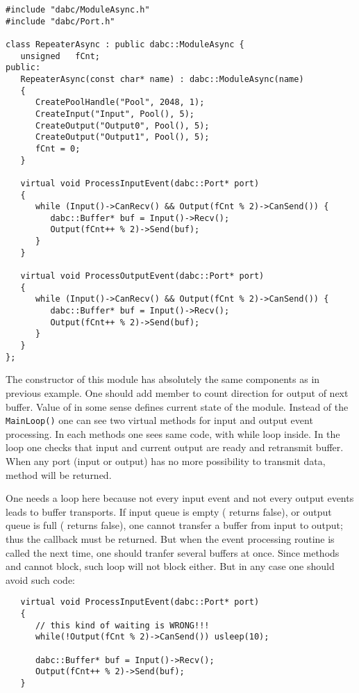 \begin{small}
\begin{verbatim}
#include "dabc/ModuleAsync.h"
#include "dabc/Port.h"

class RepeaterAsync : public dabc::ModuleAsync {
   unsigned   fCnt;
public:
   RepeaterAsync(const char* name) : dabc::ModuleAsync(name)
   {
      CreatePoolHandle("Pool", 2048, 1);
      CreateInput("Input", Pool(), 5);
      CreateOutput("Output0", Pool(), 5);
      CreateOutput("Output1", Pool(), 5);
      fCnt = 0;
   }
    
   virtual void ProcessInputEvent(dabc::Port* port) 
   {
      while (Input()->CanRecv() && Output(fCnt % 2)->CanSend()) {
         dabc::Buffer* buf = Input()->Recv();
         Output(fCnt++ % 2)->Send(buf);
      }
   }

   virtual void ProcessOutputEvent(dabc::Port* port) 
   {
      while (Input()->CanRecv() && Output(fCnt % 2)->CanSend()) {
         dabc::Buffer* buf = Input()->Recv();
         Output(fCnt++ % 2)->Send(buf);
      }
   }
};
\end{verbatim}
\end{small}

The constructor of this module has absolutely the same components as in previous example.
One should add  member to count direction for output of next buffer.
Value of  in some sense defines current state of the module. 
Instead of the {\tt MainLoop()} one can see two virtual methods for input and output event
processing. In each methods one sees same code, with while loop inside.
In the loop one checks that input and current output are ready and retransmit buffer.
When any port (input or output) has no more possibility to transmit data, 
method will be returned. 

One needs a  loop here because not every input event and not every output events leads to buffer transports. 
If input queue is empty ( returns false), 
or output queue is full ( returns false), 
one cannot transfer a buffer from input to output; 
thus the callback must be returned. 
But when the event processing routine is called the next time, 
one should tranfer several buffers at once. 
Since methods  and   
cannot block, such  loop will not block either. 
But in any case one should  avoid such  code:

\begin{small}
\begin{verbatim}
   virtual void ProcessInputEvent(dabc::Port* port) 
   {
      // this kind of waiting is WRONG!!!
      while(!Output(fCnt % 2)->CanSend()) usleep(10);
   
      dabc::Buffer* buf = Input()->Recv();
      Output(fCnt++ % 2)->Send(buf);
   }

\end{verbatim}
\end{small}

